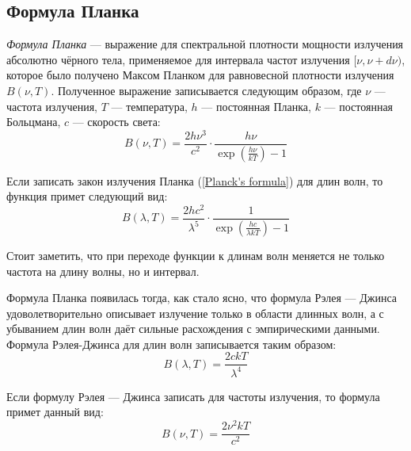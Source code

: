 \subsection{Формула Планка}

\textit{Формула Планка} --- выражение для спектральной плотности мощности излучения абсолютно чёрного тела, применяемое  для интервала частот излучения  $[\nu, \nu + d \nu)$, которое было получено Максом Планком для равновесной плотности излучения $B(\nu,T)$. Полученное выражение записывается следующим образом, где $\nu$ --- частота излучения, $T$ --- температура, $h$ --- постоянная Планка, $k$ --- постоянная Больцмана, $c$ --- скорость света:
\begin{equation}\label{Planck's formula}
B(\nu,T)=\frac{2h\nu^3}{c^2}\cdot \frac{h\nu}{\exp\left(\frac{h\nu}{kT}\right)-1}
\end{equation}

Если записать закон излучения Планка (\ref{Planck's formula}) для длин волн, то функция примет следующий вид:
\begin{equation}\label{Planck's formula2}
B(\lambda,T)=\frac{2hc^2}{\lambda^5} \cdot \frac{1}{\exp\left(\frac{hc}{\lambda kT}\right)-1}
\end{equation}

Стоит заметить, что при переходе функции к длинам волн меняется не только частота на длину волны, но и интервал. 

Формула Планка появилась тогда, как стало ясно, что формула Рэлея — Джинса удоволетворительно описывает излучение только в области длинных волн, а с убыванием длин волн даёт сильные расхождения с эмпирическими данными. Формула Рэлея-Джинса для длин волн записывается таким образом:
\begin{equation}
B(\lambda,T)=\frac{2ckT}{\lambda^4}
\end{equation}

Если формулу Рэлея — Джинса записать для частоты излучения, то формула примет данный вид:
\begin{equation}
B(\nu,T)=\frac{2\nu^2 kT}{c^2}
\end{equation}